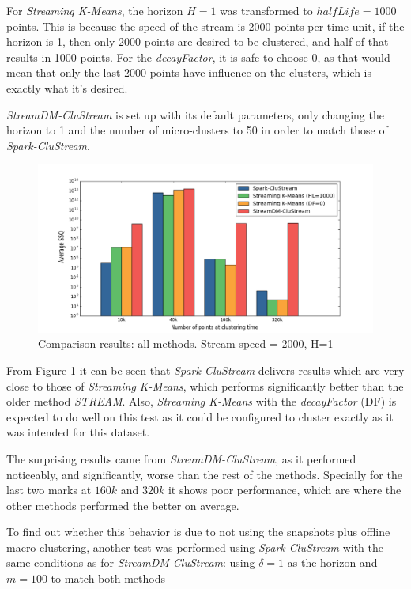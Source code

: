 For \textit{Streaming K-Means}, the horizon $H=1$ was transformed to $halfLife=1000$ points. This is because the speed of the stream is 2000 points per time unit, if the horizon is 1, then only 2000 points are desired to be clustered, and half of that results in 1000 points. For the \textit{decayFactor}, it is safe to choose 0, as that would mean that only the last 2000 points have influence on the clusters, which is exactly what it's desired.

\textit{StreamDM-CluStream} is set up with its default parameters, only changing the horizon to 1 and the number of micro-clusters to 50 in order to match those of \textit{Spark-CluStream}.

\begin{figure}[h]
 \centering
 \includegraphics[scale=0.3]{./styles/comparison2000.png}
 \caption{Comparison results: all methods. Stream speed = 2000, H=1}
 \label{fig:comparison2000}
\end{figure}

From Figure \ref{fig:comparison2000} it can be seen that \textit{Spark-CluStream} delivers results which are very close to those of \textit{Streaming K-Means}, which performs significantly better than the older method \textit{STREAM}. Also, \textit{Streaming K-Means} with the \textit{decayFactor} (DF) is expected to do well on this test as it could be configured to cluster exactly as it was intended for this dataset. 

The surprising results came from \textit{StreamDM-CluStream}, as it performed noticeably, and significantly, worse than the rest of the methods. Specially for the last two marks at $160k$ and $320k$ it shows poor performance, which are where the other methods performed the better on average.

To find out whether this behavior is due to not using the snapshots plus offline macro-clustering, another test was performed using \textit{Spark-CluStream} with the same conditions as for \textit{StreamDM-CluStream}: using $\delta = 1$ as the horizon and $m=100$ to match both methods

